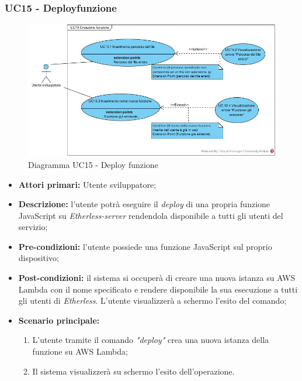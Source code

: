 \subsubsection{UC15 - Deploy\glo funzione}
\begin{figure}[h]
	\centering
	\includegraphics[width=\linewidth]{res/img/UC15.jpg}
	\caption{Diagramma UC15 - Deploy funzione}
\end{figure}
\begin{itemize}
	\item \textbf{Attori primari:} Utente sviluppatore;
	\item \textbf{Descrizione:} l'utente potrà eseguire il \textit{deploy\glo} di una propria funzione JavaScript su \textit{Etherless-server} rendendola disponibile a tutti gli utenti del servizio; 
	\item \textbf{Pre-condizioni:} l'utente possiede una funzione JavaScript sul proprio dispositivo;
	\item \textbf{Post-condizioni:} il sistema si occuperà di creare una nuova istanza su AWS Lambda con il nome specificato e rendere disponibile la sua esecuzione a tutti gli utenti di \textit{Etherless}. L'utente visualizzerà a schermo l'esito del comando;
	\item \textbf{Scenario principale:} 
	\begin{enumerate}
		\item L'utente tramite il comando \textit{"deploy\glos"} crea una nuova istanza della funzione su AWS Lambda;
		\item Il sistema visualizzerà su schermo l'esito dell'operazione.
	\end{enumerate}
\end{itemize}